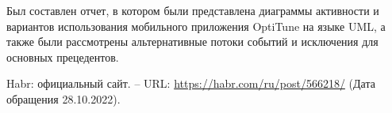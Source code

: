 \documentclass[14pt]{extreport}
\begin{document}
\conclusions

Был составлен отчет, в котором были представлена диаграммы активности и вариантов использования мобильного приложения OptiTune на языке UML, а также были рассмотрены альтернативные потоки событий и исключения для основных прецедентов.



\newpage
\begin{thebibliography}{99}

 Habr: официальный сайт. – URL: \url{https://habr.com/ru/post/566218/} (Дата обращения 28.10.2022).

\end{thebibliography}
\end{document}
